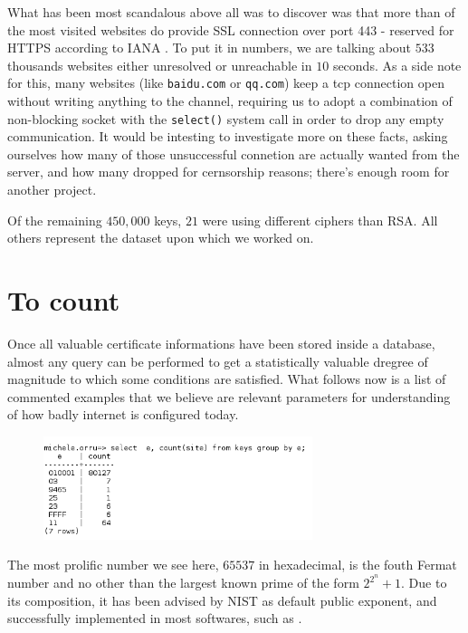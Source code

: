 What has been most scandalous above all was to discover was that more than
 of the most visited websites do  provide SSL
connection over port 443 - reserved for HTTPS according to IANA
\cite{iana:ports}.
To put it in numbers, we are talking about $533$ thousands websites either
unresolved or unreachable in $10$ seconds.
As a side note for this, many websites (like \texttt{baidu.com} or
\texttt{qq.com}) keep a tcp connection open without writing anything to the
channel, requiring us to adopt a combination of non-blocking socket with the
\texttt{select()} system call in order to drop any empty communication.
It would be intesting to investigate more on these facts, asking ourselves how
many of those unsuccessful connetion are actually wanted from the server, and
how many dropped for cernsorship reasons; there's enough room for another
project.

Of the remaining $450,000$ keys, $21$ were using different ciphers than RSA. All
others represent the dataset upon which we worked on.

\section{To count}

Once all valuable certificate informations have been stored inside a database,
almost any query can be performed to get a statistically valuable dregree of
magnitude to which some conditions are satisfied. What follows now is a list of
commented examples that we believe are relevant parameters for understanding of
how badly internet is configured today.

\begin{figure}[H]
  \includegraphics[width=0.7\textwidth]{e_count.png}
\end{figure}

The most prolific number we see here, $65537$ in hexadecimal, is the fouth
Fermat number and no other than the largest known prime of the form $2^{2^n} +
1$. Due to its composition, it has been advised by NIST as default public
exponent, and successfully implemented in most softwares, such as \openssl\!.


